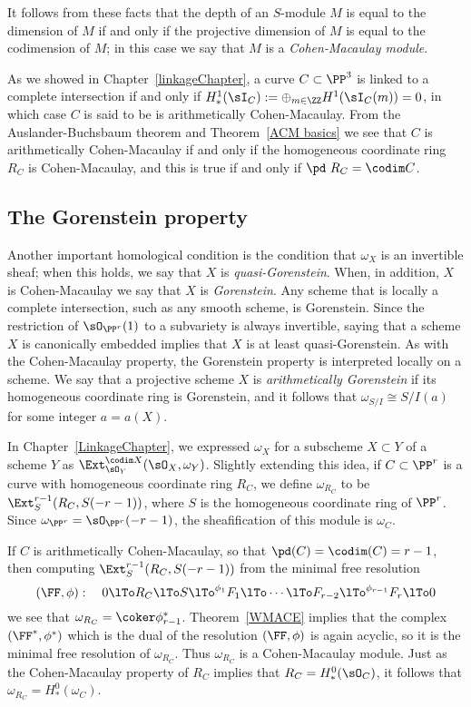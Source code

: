 It follows from these facts that the depth of an $S$-module $M$ is equal to the dimension of $M$ if and only if the projective dimension
of $M$ is equal to the codimension of $M$; in this case we say that $M$ is a
\emph{Cohen-Macaulay module}. 

As we showed in Chapter~\ref{linkageChapter}, a curve $C\subset \PP^3$ is linked to a complete intersection
if and only if  $H^1_*(\sI_C) := \oplus_{m\in \ZZ} H^1(\sI_C(m)) = 0$, in which case $C$ is said to be is arithmetically Cohen-Macaulay.
From the Auslander-Buchsbaum theorem and Theorem~\ref{ACM basics} we see that $C$ is arithmetically Cohen-Macaulay if
and only if the homogeneous coordinate ring $R_C$ is Cohen-Macaulay, and this is true
if and only if $\pd\  R_C = \codim C$.


\subsection{The Gorenstein property} 
Another important homological condition is the condition that $\omega_X$ is an invertible sheaf; when this holds, we say that $X$ is \emph{quasi-Gorenstein}. When, in addition, $X$ is Cohen-Macaulay we say that $X$ is \emph{Gorenstein}. Any scheme that is locally a complete intersection, such as any smooth scheme, is Gorenstein. Since the restriction
of $\sO_{\PP^r}(1)$ to a subvariety is always invertible, saying that a scheme $X$ is canonically embedded implies that
$X$ is at least quasi-Gorenstein. As with the Cohen-Macaulay property, the Gorenstein property is interpreted locally
on a scheme. We say that a projective scheme $X$ is \emph{arithmetically Gorenstein}
if its homogeneous coordinate ring is Gorenstein, and it follows that $\omega_{S/I} \cong S/I(a)$ for some integer $a = a(X)$.

In Chapter~\ref{LinkageChapter},  we expressed $\omega_X$
for a subscheme $X\subset Y$ of a scheme $Y$ as
 $\Ext^{\codim X}_{\sO_Y}(\sO_X, \omega_Y)$. Slightly extending this idea, if $C\subset \PP^r$ is a curve
with homogeneous coordinate ring $R_{C}$,
 we define $\omega_{R_C}$ to be $\Ext^{r-1}_S(R_C, S(-r-1))$, where $S$ is the homogeneous coordinate ring of $\PP^r$.
Since $\omega_{\PP^r} = \sO_{\PP^r}(-r-1)$, the sheafification of this module is  $\omega_C$.

If $C$ is arithmetically Cohen-Macaulay, so that
$\pd (C) = \codim(C) = r-1$,  then 
computing $\Ext^{r-1}_S(R_C, S(-r-1))$ from the minimal free resolution 
$$
(\FF, \phi):\quad 0\lTo R_C \lTo S\lTo^{\phi_1} F_1 \lTo \cdots \lTo F_{r-2} \lTo^{\phi_{r-1}} F_r\lTo 0
$$
we see that $\omega_{R_C} = \coker \phi_{r-1}^*$. Theorem~\ref{WMACE} implies that the complex $(\FF^*, \phi^*)$ which is the dual
of the  resolution $(\FF, \phi)$ is again acyclic, so it is the minimal free resolution of $\omega_{R_C}$. Thus 
$\omega_{R_C}$ is a Cohen-Macaulay module. Just as the Cohen-Macaulay property of
$R_C$ implies that $R_C = H^0_*(\sO_C)$, it follows that $\omega_{R_C} = H^0_*(\omega_C)$.

